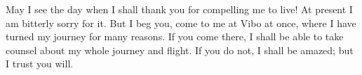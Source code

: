 

May I see the day when I shall thank you for compelling me to live! At present I am bitterly sorry for it. But I beg you, come to me at Vibo at once, where I have turned my journey for many reasons. If you come there, I shall be able to take counsel about my whole journey and flight. If you do not, I shall be amazed; but I trust you will.
